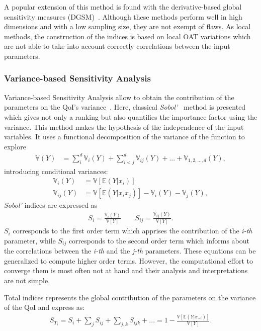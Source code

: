 A popular extension of this method is found with the derivative-based global sensitivity measures (DGSM)~\cite{kucherenko2016,Becker2018}. Although these methods perform well in high dimensions and with a low sampling size, they are not exempt of flaws. As local methods, the construction of the indices is based on local OAT variations which are not able to take into account correctly correlations between the input parameters.

\subsubsection{Variance-based Sensitivity Analysis}
Variance-based Sensitivity Analysis allow to obtain the contribution of the parameters on the QoI's variance~\cite{ferretti2016}. Here, classical \textit{Sobol'}~\cite{Sobol1993} method is presented which gives not only a ranking but also quantifies the importance factor using the variance. This method makes the hypothesis of the independence of the input variables. It uses a functional decomposition of the variance of the function to explore
\begin{align}
\mathbb{V}(Y) &= \sum_{i}^{d} \mathbb{V}_i (Y) + \sum_{i<j}^{d}\mathbb{V}_{ij}(Y) + ... + \mathbb{V}_{1,2,...,d}(Y),
\end{align}
\noindent introducing conditional variances:
\begin{align}
\mathbb{V}_i(Y) &= \mathbb{\mathbb{V}}[\mathbb{E}(Y|x_i)]\nonumber\\
\mathbb{V}_{ij}(Y) &= \mathbb{\mathbb{V}}[\mathbb{E}(Y|x_i x_j)] - \mathbb{V}_i(Y) - \mathbb{V}_j(Y),\nonumber
\end{align}
\noindent \textit{Sobol'} indices are expressed as
\begin{align}
S_i = \frac{\mathbb{V}_i(Y)}{\mathbb{V}[Y]}\qquad S_{ij} = \frac{\mathbb{V}_{ij}(Y)}{\mathbb{V}[Y]}.
\end{align}
\noindent $S_{i}$ corresponds to the first order term which apprises the contribution of the \textit{i-th} parameter, while $S_{ij}$ corresponds to the second order term which informs about the correlations between the \textit{i-th} and the \textit{j-th} parameters. These equations can be generalized to compute higher order terms. However, the computational effort to converge them is most often not at hand and their analysis and interpretations are not simple.

Total indices represents the global contribution of the parameters on the variance of the QoI and express as:
\begin{align}
S_{T_i} = S_i + \sum_j S_{ij} + \sum_{j,k} S_{ijk} + ... = 1 - \frac{\mathbb{V}[\mathbb{E}(Y|x_{\sim i})]}{\mathbb{V}[Y]}.
\end{align}

